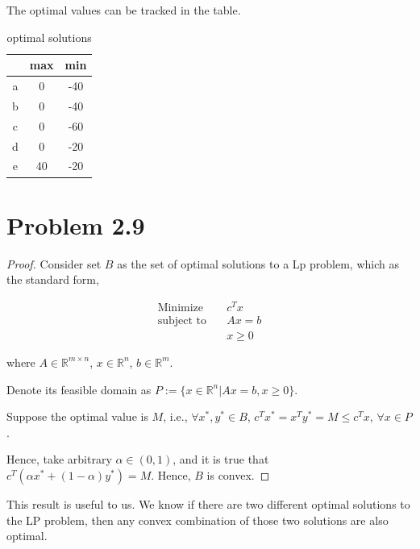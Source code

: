 \documentclass[12pt]{article}
\begin{document}
The optimal values can be tracked in the table.

\begin{table}
\centering
\caption{optimal solutions}
\label{2.8values}
\begin{tabular}{|c|c|c|}
\hline
  & max & min \\ \hline
a & 0   & -40 \\ \hline
b & 0   & -40 \\ \hline
c & 0   & -60 \\ \hline
d & 0   & -20 \\ \hline
e & 40  & -20 \\ \hline
\end{tabular}
\end{table}

\FloatBarrier

\section*{Problem 2.9}

\begin{proof}

Consider set $B$ as the set of optimal solutions to a Lp problem, which as the standard form,

\begin{equation*}
\begin{aligned}
\text{Minimize} \quad & c^Tx \\
\text{subject\  to} \quad & Ax = b \\
 & x \geqslant 0
\end{aligned}
\end{equation*}

where $A \in \mathbb{R}^{m\times n}$, $x\in \mathbb{R}^n$, $b \in \mathbb{R}^m$.

Denote its feasible domain as $P := \{x \in \mathbb{R}^n | Ax = b, x \geqslant 0 \}$. 

Suppose the optimal value is $M$, i.e., $\forall x^*, y^*\in B$, $c^Tx^* = x^Ty^* = M \leqslant c^Tx$, $\forall x\in P$.

Hence, take arbitrary $\alpha \in (0, 1)$, and it is true that $c^T(\alpha x^* + (1-\alpha) y^*) = M$. Hence, $B$ is convex.

\end{proof}

This result is useful to us. We know if there are two different optimal solutions to the LP problem, then any convex combination of those two solutions are also optimal.
\end{document}
